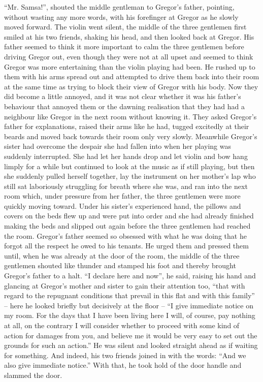 “Mr. Samsa!”, shouted the middle gentleman to Gregor’s father,
pointing, without wasting any more words, with his forefinger at Gregor
as he slowly moved forward. The violin went silent, the middle of the
three gentlemen first smiled at his two friends, shaking his head, and
then looked back at Gregor. His father seemed to think it more
important to calm the three gentlemen before driving Gregor out, even
though they were not at all upset and seemed to think Gregor was more
entertaining than the violin playing had been. He rushed up to them
with his arms spread out and attempted to drive them back into their
room at the same time as trying to block their view of Gregor with his
body. Now they did become a little annoyed, and it was not clear
whether it was his father’s behaviour that annoyed them or the dawning
realisation that they had had a neighbour like Gregor in the next room
without knowing it. They asked Gregor’s father for explanations, raised
their arms like he had, tugged excitedly at their beards and moved back
towards their room only very slowly. Meanwhile Gregor’s sister had
overcome the despair she had fallen into when her playing was suddenly
interrupted. She had let her hands drop and let violin and bow hang
limply for a while but continued to look at the music as if still
playing, but then she suddenly pulled herself together, lay the
instrument on her mother’s lap who still sat laboriously struggling for
breath where she was, and ran into the next room which, under pressure
from her father, the three gentlemen were more quickly moving toward.
Under his sister’s experienced hand, the pillows and covers on the beds
flew up and were put into order and she had already finished making the
beds and slipped out again before the three gentlemen had reached the
room. Gregor’s father seemed so obsessed with what he was doing that he
forgot all the respect he owed to his tenants. He urged them and
pressed them until, when he was already at the door of the room, the
middle of the three gentlemen shouted like thunder and stamped his foot
and thereby brought Gregor’s father to a halt. “I declare here and
now”, he said, raising his hand and glancing at Gregor’s mother and
sister to gain their attention too, “that with regard to the repugnant
conditions that prevail in this flat and with this family” – here he
looked briefly but decisively at the floor – “I give immediate notice on
my room. For the days that I have been living here I will, of course,
pay nothing at all, on the contrary I will consider whether to proceed
with some kind of action for damages from you, and believe me it would
be very easy to set out the grounds for such an action.” He was silent
and looked straight ahead as if waiting for something. And indeed, his
two friends joined in with the words: “And we also give immediate
notice.” With that, he took hold of the door handle and slammed the
door.

